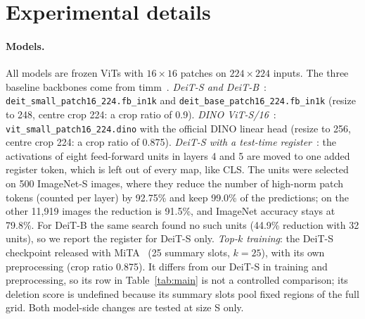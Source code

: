 
\captionsetup{skip=5pt}
\raggedbottom

\section{Experimental details}
\label{app:setup}

\paragraph{Models.} All models are frozen ViTs with $16{\times}16$ patches on $224{\times}224$ inputs. The three baseline backbones come from timm~\citep{wightman2019}. \emph{DeiT-S and DeiT-B}~\citep{touvron2021}: \texttt{deit\_small\_patch16\_224.fb\_in1k} and \texttt{deit\_base\_patch16\_224.fb\_in1k} (resize to 248, centre crop 224: a crop ratio of 0.9). \emph{DINO ViT-S/16}~\citep{caron2021}: \texttt{vit\_small\_patch16\_224.dino} with the official DINO linear head (resize to 256, centre crop 224: a crop ratio of 0.875). \emph{DeiT-S with a test-time register}~\citep{jiang2025}: the activations of eight feed-forward units in layers 4 and 5 are moved to one added register token, which is left out of every map, like CLS. The units were selected on 500 ImageNet-S images, where they reduce the number of high-norm patch tokens (counted per layer) by 92.75\% and keep 99.0\% of the predictions; on the other 11,919 images the reduction is 91.5\%, and ImageNet accuracy stays at 79.8\%. For DeiT-B the same search found no such units (44.9\% reduction with 32 units), so we report the register for DeiT-S only. \emph{Top-$k$ training}: the DeiT-S checkpoint released with MiTA~\citep{wen2026mita} (25 summary slots, $k=25$), with its own preprocessing (crop ratio 0.875). It differs from our DeiT-S in training and preprocessing, so its row in Table~\ref{tab:main} is not a controlled comparison; its deletion score is undefined because its summary slots pool fixed regions of the full grid. Both model-side changes are tested at size S only.

